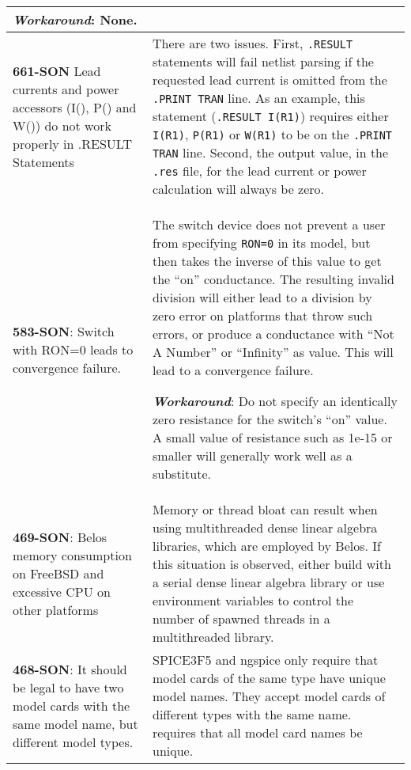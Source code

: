 {\begin{longtable}[h] {>{\raggedright\small}m{2in}|>{\raggedright\let\\\tabularnewline\small}m{3.5in}}
\textbf{\textit{Workaround}}: None. \\ \hline

\textbf{661-SON} Lead currents and power accessors (I(), P() and W()) do
not work properly in .RESULT Statements & There are two issues.
First, \texttt{.RESULT} statements will fail netlist parsing if the
requested lead current is omitted from the \texttt{.PRINT TRAN}
line.  As an example, this statement (\texttt{.RESULT I(R1)}) requires
either \texttt{I(R1)},
\texttt{P(R1)} or \texttt{W(R1)} to be on the \texttt{.PRINT TRAN} line.
Second, the output value, in the \texttt{.res} file, for the lead
current or power calculation will always be zero.
\\ \hline

\textbf{583-SON}: Switch with RON=0 leads to convergence failure. &
The switch device does not prevent a user from
specifying \texttt{RON=0} in its model, but then takes the inverse of
this value to get the ``on'' conductance.  The resulting invalid
division will either lead to a division by zero error on platforms
that throw such errors, or produce a conductance with ``Not A Number''
or ``Infinity'' as value.  This will lead to a convergence failure.

\textbf{\textit{Workaround}}: Do not specify an identically zero resistance
for the switch's ``on'' value.  A small value of resistance such as
1e-15 or smaller will generally work well as a substitute. \\ \hline


\textbf{469-SON}: Belos memory consumption on FreeBSD and excessive CPU on other
platforms & Memory or thread bloat can result when using multithreaded
dense linear algebra libraries, which are employed by Belos.  If this
situation is observed, either build
\Xyce{} with a serial dense linear algebra library or use environment variables
to control the number of spawned threads in a multithreaded library.
\\ \hline


\textbf{468-SON}: It should be legal to have two model cards with the same model
name, but different model types. & SPICE3F5 and ngspice only require
that model cards of the same type have unique model names. They accept
model cards of different types with the same name.  \Xyce{} requires
that all model card names be unique.
\\ \hline



\end{longtable}}
